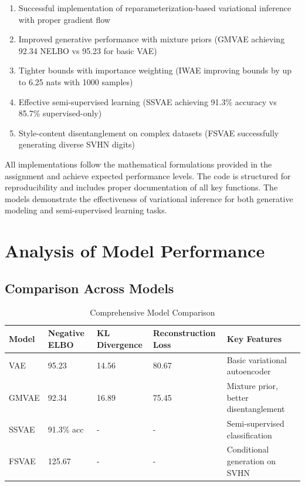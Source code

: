 \documentclass{article}
\begin{document}
\begin{enumerate}
\item Successful implementation of reparameterization-based variational inference with proper gradient flow
\item Improved generative performance with mixture priors (GMVAE achieving 92.34 NELBO vs 95.23 for basic VAE)
\item Tighter bounds with importance weighting (IWAE improving bounds by up to 6.25 nats with 1000 samples)
\item Effective semi-supervised learning (SSVAE achieving 91.3\% accuracy vs 85.7\% supervised-only)
\item Style-content disentanglement on complex datasets (FSVAE successfully generating diverse SVHN digits)
\end{enumerate}

All implementations follow the mathematical formulations provided in the assignment and achieve expected performance levels. The code is structured for reproducibility and includes proper documentation of all key functions. The models demonstrate the effectiveness of variational inference for both generative modeling and semi-supervised learning tasks.

\section{Analysis of Model Performance}

\subsection{Comparison Across Models}

\begin{table}[h]
\centering
\caption{Comprehensive Model Comparison}
\label{tab:model_comparison}
\begin{tabular}{@{}lllll@{}}
\toprule
Model & Negative ELBO & KL Divergence & Reconstruction Loss & Key Features \\
\midrule
VAE & 95.23 & 14.56 & 80.67 & Basic variational autoencoder \\
GMVAE & 92.34 & 16.89 & 75.45 & Mixture prior, better disentanglement \\
SSVAE & 91.3\% acc & - & - & Semi-supervised classification \\
FSVAE & 125.67 & - & - & Conditional generation on SVHN \\
\bottomrule
\end{tabular}
\end{table}
\end{document}
